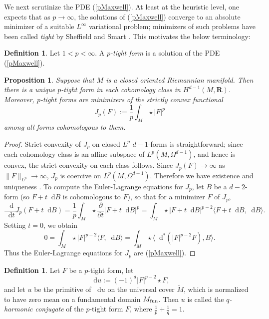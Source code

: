 \documentclass[reqno,11pt]{amsart}
\newcommand{\RR}{\mathbf{R}}
\newcommand*\dif{\mathop{}\!\mathrm{d}}
\newcommand{\dfn}[1]{\emph{#1}\index{#1}}
\newtheorem{proposition}[theorem]{Proposition}
\theoremstyle{definition}
\newtheorem{definition}[theorem]{Definition}
\numberwithin{equation}{section}
\begin{document}
We next scrutinize the PDE (\ref{pMaxwell}).
At least at the heuristic level, one expects that as $p \to \infty$, the solutions of (\ref{pMaxwell}) converge to an absolute minimizer of a suitable $L^\infty$ variational problem; minimizers of such problems have been called \dfn{tight} by Sheffield and Smart \cite{Sheffield12}.
This motivates the below terminology:

\begin{definition}
Let $1 < p < \infty$.
A \dfn{$p$-tight form} is a solution of the PDE (\ref{pMaxwell}).
\end{definition}

\begin{proposition}
Suppose that $M$ is a closed oriented Riemannian manifold.
Then there is a unique $p$-tight form in each cohomology class in $H^{d - 1}(M, \RR)$.
Moreover, $p$-tight forms are minimizers of the strictly convex functional
$$J_p(F) := \frac{1}{p} \int_M \star |F|^p$$
among all forms cohomologous to them.
\end{proposition}
\begin{proof}
Strict convexity of $J_p$ on closed $L^p$ $d - 1$-forms is straightforward; since each cohomology class is an affine subspace of $L^p(M, \Omega^{d - 1})$, and hence is convex, the strict convexity on each class follows.
Since $J_p(F) \to \infty$ as $\|F\|_{L^p} \to \infty$, $J_p$ is coercive on $L^p(M, \Omega^{d - 1})$.
Therefore we have existence and uniqueness \cite[Chapter II]{Ekeland99}.
To compute the Euler-Lagrange equations for $J_p$, let $B$ be a $d-2$-form (so $F + t \dif B$ is cohomologous to $F$), so that for a minimizer $F$ of $J_p$,
$$\frac{\dif}{\dif t} J_p(F + t \dif B) = \frac{1}{p} \int_M \star \frac{\partial}{\partial t} |F + t \dif B|^p = \int_M \star |F + t \dif B|^{p - 2} \langle F + t \dif B, \dif B\rangle.$$
Setting $t = 0$, we obtain 
$$0 = \int_M \star |F|^{p - 2} \langle F, \dif B\rangle = \int_M \star \langle \dif^*(|F|^{p - 2} F), B\rangle.$$
Thus the Euler-Lagrange equations for $J_p$ are (\ref{pMaxwell}).
\end{proof}

\begin{definition}
Let $F$ be a $p$-tight form, let
\begin{equation}
\dif u := (-1)^d |F|^{p - 2} \star F, \label{inverse extremality}
\end{equation}
and let $u$ be the primitive of $\dif u$ on the universal cover $\tilde M$, which is normalized to have zero mean on a fundamental domain $M_{\rm fun}$.
Then $u$ is called the \dfn{$q$-harmonic conjugate} of the $p$-tight form $F$, where $\frac{1}{p} + \frac{1}{q} = 1$.
\end{definition}
\end{document}
